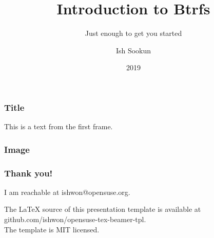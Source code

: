\documentclass[aspectratio=169]{beamer}
\title{Introduction to Btrfs}
\subtitle{Just enough to get you started}
\author{Ish Sookun}
\date{2019}
\begin{document}
 
\frame{\titlepage}
 
\begin{frame}
\frametitle{Title}
This is a text from the first frame.
\end{frame}

\begin{frame}
\frametitle{Image}

\end{frame}

\begin{frame}
    \frametitle{Thank you!}
    I am reachable at ishwon@opensuse.org.\vspace{1em}

    \tiny The LaTeX source of this presentation template is available at github.com/ishwon/opensuse-tex-beamer-tpl.\\
    The template is MIT licensed.
    \end{frame}
 
\end{document}
